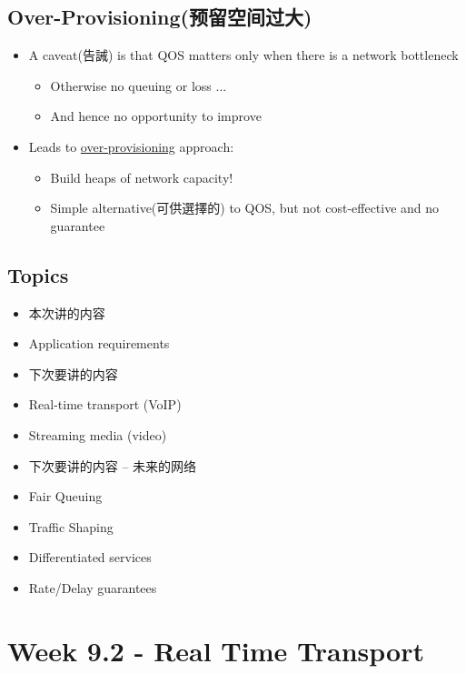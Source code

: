 \documentclass[12pt]{ctexart}   %
\begin{document}
	\subsection{Over-Provisioning(预留空间过大)}
	\begin{itemize}
		\item A caveat(告誡) is that QOS matters only when there is a network bottleneck
		\begin{itemize}
			\item Otherwise no queuing or loss ...
			\item And hence no opportunity to improve
		\end{itemize}
		
		\item Leads to \underline{over-provisioning} approach:
		\begin{itemize}
			\item Build heaps of network capacity!
			\item Simple alternative(可供選擇的) to QOS, but not cost-effective and no guarantee
		\end{itemize}
	\end{itemize}
	
	\subsection{Topics}
	\begin{itemize}
		\item {\color{red} 本次讲的内容}
		\item Application requirements
		
		\item {\color{red} 下次要讲的内容}
		\item Real-time transport (VoIP)
		\item Streaming media (video)
		
		\item {\color{blue} 下次要讲的内容  --  未来的网络}
		\item Fair Queuing
		\item Traffic Shaping
		\item Differentiated services
		\item Rate/Delay guarantees
	\end{itemize}
	
\section{Week 9.2 - Real Time Transport}
\end{document}
